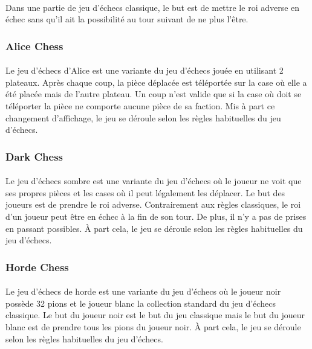 \documentclass[10pt, a4paper]{article}
\begin{document}
					\paragraph{}Dans une partie de jeu d'échecs classique, le but est de mettre le roi adverse en échec sans qu'il ait la possibilité au tour suivant de ne plus l'être.
				\subsubsection{Alice Chess}
					\paragraph{}Le jeu d'échecs d'Alice est une variante du jeu d'échecs jouée en utilisant 2 plateaux. Après chaque coup, la pièce déplacée est téléportée sur la case où elle a été placée mais de l'autre plateau. Un coup n'est valide que si la case où doit se téléporter la pièce ne comporte aucune pièce de sa faction. Mis à part ce changement d'affichage, le jeu se déroule selon les règles habituelles du jeu d'échecs.
				\subsubsection{Dark Chess}
					\paragraph{} Le jeu d'échecs sombre est une variante du jeu d'échecs où le joueur ne voit que ses propres pièces et les cases où il peut légalement les déplacer. Le but des joueurs est de prendre le roi adverse. Contrairement aux règles classiques, le roi d'un joueur peut être en échec à la fin de son tour. De plus, il n'y a pas de prises en passant possibles. À part cela, le jeu se déroule selon les règles habituelles du jeu d'échecs.
				\subsubsection{Horde Chess}
					\paragraph{} Le jeu d'échecs de horde est une variante du jeu d'échecs où le joueur noir possède 32 pions et le joueur blanc la collection standard du jeu d'échecs classique. Le but du joueur noir est le but du jeu classique mais le but du joueur blanc est de prendre tous les pions du joueur noir. À part cela, le jeu se déroule selon les règles habituelles du jeu d'échecs.
\end{document}
